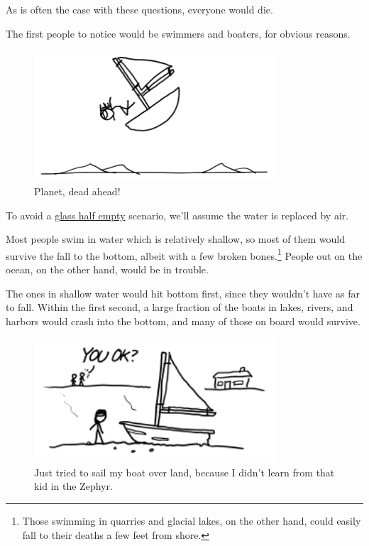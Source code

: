 {\hfill{}

{As is often the case with these questions, everyone would die.}

{The first people to notice would be swimmers and boaters, for obvious reasons.}

\begin{figure}[!htbp]
\centering
\includegraphics[scale=0.5, max width=0.8\textwidth]{imgs/a/103/boat.png}
\caption{Planet, dead ahead!}
\end{figure}

{To avoid a \href{http://what-if.xkcd.com/6/}{glass half empty} scenario, we'll assume the water is replaced by air.}

{Most people swim in water which is relatively shallow, so most of them would survive the fall to the bottom, albeit with a few broken bones.{\footnote{Those swimming in quarries and glacial lakes, on the other hand, could easily fall to their deaths a few feet from shore.} } People out on the ocean, on the other hand, would be in trouble.}

{The ones in shallow water would hit bottom first, since they wouldn't have as far to fall. Within the first second, a large fraction of the boats in lakes, rivers, and harbors would crash into the bottom, and many of those on board would survive.}

\begin{figure}[!htbp]
\centering
\includegraphics[scale=0.5, max width=0.8\textwidth]{imgs/a/103/wreck.png}
\caption{Just tried to sail my boat over land, because I didn't learn from that kid in the Zephyr.}
\end{figure}

}

